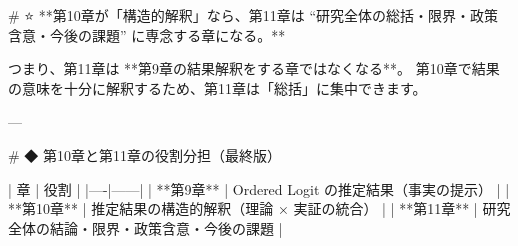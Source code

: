 %
%
%
%
%
%
%
%
%
%
%
\iffalse
# ⭐ **第10章が「構造的解釈」なら、第11章は  
“研究全体の総括・限界・政策含意・今後の課題” に専念する章になる。**

つまり、第11章は **第9章の結果解釈をする章ではなくなる**。  
第10章で結果の意味を十分に解釈するため、第11章は「総括」に集中できます。

---

# ◆ 第10章と第11章の役割分担（最終版）

| 章 | 役割 |
|----|------|
| **第9章** | Ordered Logit の推定結果（事実の提示） |
| **第10章** | 推定結果の構造的解釈（理論 × 実証の統合） |
| **第11章** | 研究全体の結論・限界・政策含意・今後の課題 |

